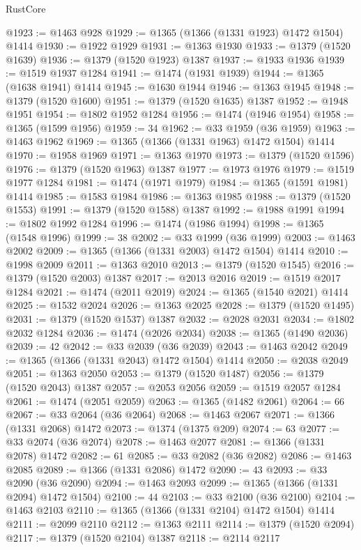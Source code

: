 \begin{lexlean}{RustCore}
\begin{coremodule}
@1923 := @1463 @928
@1929 := @1365 (@1366 (@1331 @1923) @1472 @1504) @1414
@1930 := @1922 @1929
@1931 := @1363 @1930
@1933 := @1379 (@1520 @1639)
@1936 := @1379 (@1520 @1923) @1387
@1937 := @1933 @1936
@1939 := @1519 @1937 @1284
@1941 := @1474 (@1931 @1939)
@1944 := @1365 (@1638 @1941) @1414
@1945 := @1630 @1944
@1946 := @1363 @1945
@1948 := @1379 (@1520 @1600)
@1951 := @1379 (@1520 @1635) @1387
@1952 := @1948 @1951
@1954 := @1802 @1952 @1284
@1956 := @1474 (@1946 @1954)
@1958 := @1365 (@1599 @1956)
@1959 := 34
@1962 := @33 @1959 (@36 @1959)
@1963 := @1463 @1962
@1969 := @1365 (@1366 (@1331 @1963) @1472 @1504) @1414
@1970 := @1958 @1969
@1971 := @1363 @1970
@1973 := @1379 (@1520 @1596)
@1976 := @1379 (@1520 @1963) @1387
@1977 := @1973 @1976
@1979 := @1519 @1977 @1284
@1981 := @1474 (@1971 @1979)
@1984 := @1365 (@1591 @1981) @1414
@1985 := @1583 @1984
@1986 := @1363 @1985
@1988 := @1379 (@1520 @1553)
@1991 := @1379 (@1520 @1588) @1387
@1992 := @1988 @1991
@1994 := @1802 @1992 @1284
@1996 := @1474 (@1986 @1994)
@1998 := @1365 (@1548 @1996)
@1999 := 38
@2002 := @33 @1999 (@36 @1999)
@2003 := @1463 @2002
@2009 := @1365 (@1366 (@1331 @2003) @1472 @1504) @1414
@2010 := @1998 @2009
@2011 := @1363 @2010
@2013 := @1379 (@1520 @1545)
@2016 := @1379 (@1520 @2003) @1387
@2017 := @2013 @2016
@2019 := @1519 @2017 @1284
@2021 := @1474 (@2011 @2019)
@2024 := @1365 (@1540 @2021) @1414
@2025 := @1532 @2024
@2026 := @1363 @2025
@2028 := @1379 (@1520 @1495)
@2031 := @1379 (@1520 @1537) @1387
@2032 := @2028 @2031
@2034 := @1802 @2032 @1284
@2036 := @1474 (@2026 @2034)
@2038 := @1365 (@1490 @2036)
@2039 := 42
@2042 := @33 @2039 (@36 @2039)
@2043 := @1463 @2042
@2049 := @1365 (@1366 (@1331 @2043) @1472 @1504) @1414
@2050 := @2038 @2049
@2051 := @1363 @2050
@2053 := @1379 (@1520 @1487)
@2056 := @1379 (@1520 @2043) @1387
@2057 := @2053 @2056
@2059 := @1519 @2057 @1284
@2061 := @1474 (@2051 @2059)
@2063 := @1365 (@1482 @2061)
@2064 := 66
@2067 := @33 @2064 (@36 @2064)
@2068 := @1463 @2067
@2071 := @1366 (@1331 @2068) @1472
@2073 := @1374 (@1375 @209)
@2074 := 63
@2077 := @33 @2074 (@36 @2074)
@2078 := @1463 @2077
@2081 := @1366 (@1331 @2078) @1472
@2082 := 61
@2085 := @33 @2082 (@36 @2082)
@2086 := @1463 @2085
@2089 := @1366 (@1331 @2086) @1472
@2090 := 43
@2093 := @33 @2090 (@36 @2090)
@2094 := @1463 @2093
@2099 := @1365 (@1366 (@1331 @2094) @1472 @1504)
@2100 := 44
@2103 := @33 @2100 (@36 @2100)
@2104 := @1463 @2103
@2110 := @1365 (@1366 (@1331 @2104) @1472 @1504) @1414
@2111 := @2099 @2110
@2112 := @1363 @2111
@2114 := @1379 (@1520 @2094)
@2117 := @1379 (@1520 @2104) @1387
@2118 := @2114 @2117

\end{coremodule}
\end{lexlean}
